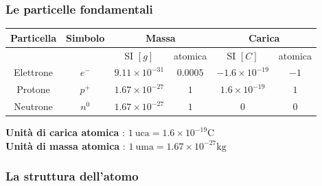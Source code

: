 \documentclass[twoside]{article}
\begin{document}
\subsubsection{Le particelle fondamentali}
\begin{table}[H]
  \centering
  \begin{tabular}{|c|c|c|c|c|c|}
    \hline
    \rowcolor{myblue}
    \textbf{Particella} & \textbf{Simbolo} & \multicolumn{2}{|c|}{\textbf{Massa}} & \multicolumn{2}{|c|}{\textbf{Carica}  }                                      \\
    \hline
                        &                  & SI \(\left[g\right]\)                & atomica                                 & SI \(\left[C\right]\)    & atomica \\
    Elettrone           & \(e^-\)          & \(9.11 \times 10^{-31}\)             & \(0.0005\)                              & \(-1.6 \times 10^{-19}\) & \(-1\)  \\
    Protone             & \(p^+\)          & \(1.67 \times 10^{-27}\)             & \(1\)                                   & \(1.6 \times 10^{-19}\)  & \(1\)   \\
    Neutrone            & \(n^0\)          & \(1.67 \times 10^{-27}\)             & \(1\)                                   & \(0\)                    & \(0\)   \\
    \hline
  \end{tabular}
\end{table}
\noindent
\textbf{Unità di carica atomica} : \(1\ \text{uca} = 1.6 \times 10^{-19} \text{C}\)\\
\textbf{Unità di massa atomica} : \(1\ \text{uma} = 1.67 \times 10^{-27} \text{kg}\)\footnotemark[1]\\
\subsubsection{La struttura dell'atomo}
\begin{figure}[H]
  \centering
\end{figure}
\end{document}
